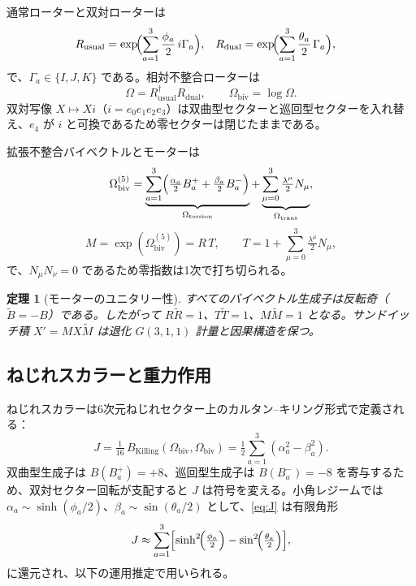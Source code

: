 \documentclass[dvipdfmx,a4paper]{article}
\newtheorem{theorem}{定理}[section]
\theoremstyle{definition}
\begin{document}
通常ローターと双対ローターは
\begin{align}
R_{\mathrm{usual}} &= \exp\!\Bigl(\sum_{a=1}^3 \frac{\phi_a}{2}\, i\Gamma_a\Bigr),
&
R_{\mathrm{dual}} &= \exp\!\Bigl(\sum_{a=1}^3 \frac{\theta_a}{2}\, \Gamma_a\Bigr),
\end{align}
で、$\Gamma_a\in\{I,J,K\}$ である。相対不整合ローターは
\begin{equation}
\Omega = R_{\mathrm{usual}}^\dagger R_{\mathrm{dual}},
\qquad
\Omega_{\mathrm{biv}} = \log\Omega.
\label{eq:omega}
\end{equation}
双対写像 $X\mapsto Xi$（$i=e_0e_1e_2e_3$）は双曲型セクターと巡回型セクターを入れ替え、$e_4$ が $i$ と可換であるため零セクターは閉じたままである。

拡張不整合バイベクトルとモーターは
\begin{equation}
\Omega_{\mathrm{biv}}^{(5)}
= \underbrace{\sum_{a=1}^3 \Bigl(\tfrac{\alpha_a}{2}B_a^{+} + \tfrac{\beta_a}{2}B_a^{-}\Bigr)}_{\Omega_{\mathrm{torsion}}}
+ \underbrace{\sum_{\mu=0}^{3}\tfrac{\lambda^\mu}{2}N_\mu}_{\Omega_{\mathrm{trans}}},
\label{eq:omega5}
\end{equation}
\begin{equation}
M = \exp(\Omega_{\mathrm{biv}}^{(5)}) = R\,T,
\qquad
T = 1 + \sum_{\mu=0}^{3}\tfrac{\lambda^\mu}{2}N_\mu,
\label{eq:motor}
\end{equation}
で、$N_\mu N_\nu=0$ であるため零指数は1次で打ち切られる。

\begin{theorem}[モーターのユニタリー性]
\label{thm:unitarity}
すべてのバイベクトル生成子は反転奇（$\widetilde{B}=-B$）である。したがって $R\widetilde{R}=1$、$T\widetilde{T}=1$、$M\widetilde{M}=1$ となる。サンドイッチ積 $X'=MX\widetilde{M}$ は退化 $G(3,1,1)$ 計量と因果構造を保つ。
\end{theorem}

\subsection{ねじれスカラーと重力作用}

ねじれスカラーは6次元ねじれセクター上のカルタン--キリング形式で定義される：
\begin{equation}
J = \tfrac{1}{16}\,B_{\mathrm{Killing}}(\Omega_{\mathrm{biv}},\Omega_{\mathrm{biv}})
= \tfrac{1}{2}\sum_{a=1}^{3}(\alpha_a^2 - \beta_a^2).
\label{eq:J}
\end{equation}
双曲型生成子は $B(B_a^{+})=+8$、巡回型生成子は $B(B_a^{-})=-8$ を寄与するため、双対セクター回転が支配すると $J$ は符号を変える。小角レジームでは $\alpha_a\sim\sinh(\phi_a/2)$、$\beta_a\sim\sin(\theta_a/2)$ として、\eqref{eq:J} は有限角形
\begin{equation}
J \approx \sum_{a=1}^{3}\Bigl[\sinh^2\!\Bigl(\tfrac{\phi_a}{2}\Bigr) - \sin^2\!\Bigl(\tfrac{\theta_a}{2}\Bigr)\Bigr],
\label{eq:J-finite}
\end{equation}
に還元され、以下の運用推定で用いられる。
\end{document}
